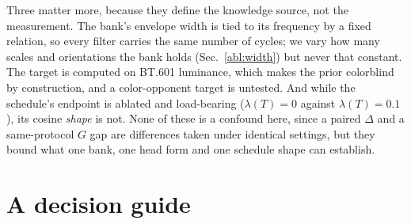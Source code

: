  Three matter more, because they define the knowledge source, not
the measurement. The bank's envelope width is tied to its frequency by a fixed
relation, so every filter carries the same number of cycles; we vary how many
scales and orientations the bank holds (Sec.~\ref{abl:width}) but never that
constant. The target is computed on BT.601 luminance, which makes the prior
colorblind by construction, and a color-opponent target is untested. And while
the schedule's endpoint is ablated and load-bearing ($\lambda(T)=0$ against
$\lambda(T)=0.1$), its cosine \emph{shape} is not. None of these is a confound
here, since a paired $\Delta$ and a same-protocol $G$ gap are differences taken
under identical settings, but they bound what one bank, one head form and one
schedule shape can establish.

\section{A decision guide}\label{sec:guide}

